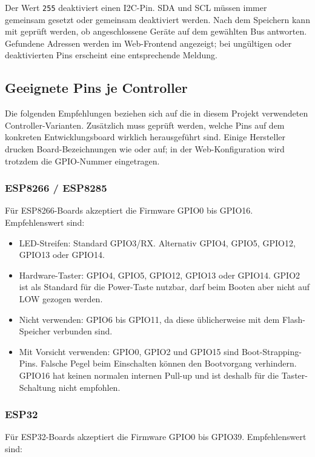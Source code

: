 \documentclass[12pt,a4paper, german,oneside, headinclude, headsepline,plainheadsepline,BCOR20mm, DIV18,parskip=half, openright, numbers=noenddot, captions=tableheading,version=first,listof=totoc,version=first]{scrbook}
\begin{document}
Der Wert \texttt{255} deaktiviert einen I2C-Pin. SDA und SCL müssen immer gemeinsam gesetzt oder gemeinsam deaktiviert werden. Nach dem Speichern kann mit  geprüft werden, ob angeschlossene Geräte auf dem gewählten Bus antworten. Gefundene Adressen werden im Web-Frontend angezeigt; bei ungültigen oder deaktivierten Pins erscheint eine entsprechende Meldung.

\subsection{Geeignete Pins je Controller}

Die folgenden Empfehlungen beziehen sich auf die in diesem Projekt verwendeten Controller-Varianten. Zusätzlich muss geprüft werden, welche Pins auf dem konkreten Entwicklungsboard wirklich herausgeführt sind. Einige Hersteller drucken Board-Bezeichnungen wie  oder  auf; in der Web-Konfiguration wird trotzdem die GPIO-Nummer eingetragen.

\subsubsection{ESP8266 / ESP8285}

Für ESP8266-Boards akzeptiert die Firmware GPIO0 bis GPIO16. Empfehlenswert sind:

\begin{itemize}
    \item LED-Streifen: Standard GPIO3/RX. Alternativ GPIO4, GPIO5, GPIO12, GPIO13 oder GPIO14.
    \item Hardware-Taster: GPIO4, GPIO5, GPIO12, GPIO13 oder GPIO14. GPIO2 ist als Standard für die Power-Taste nutzbar, darf beim Booten aber nicht auf LOW gezogen werden.
    \item Nicht verwenden: GPIO6 bis GPIO11, da diese üblicherweise mit dem Flash-Speicher verbunden sind.
    \item Mit Vorsicht verwenden: GPIO0, GPIO2 und GPIO15 sind Boot-Strapping-Pins. Falsche Pegel beim Einschalten können den Bootvorgang verhindern. GPIO16 hat keinen normalen internen Pull-up und ist deshalb für die Taster-Schaltung nicht empfohlen.
\end{itemize}

\subsubsection{ESP32}

Für ESP32-Boards akzeptiert die Firmware GPIO0 bis GPIO39. Empfehlenswert sind:
\end{document}
